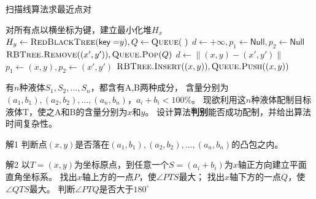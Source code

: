 \begin{questions}
    \begin{algorithm}[!htp]
        \caption{扫描线算法求最近点对}\label{alg:0426:3}
        \begin{algorithmic}[1]
            \State 对所有点以横坐标为键，建立最小化堆$H_x$
            \State $H_y \gets \Call{RedBlackTree}{\mathsf{key=}y}, Q \gets \Call{Queue}{\ }$
            \State $d \gets +\infty, p_1 \gets \mathsf{Null}, p_2 \gets \mathsf{Null}$
             
            \State $\Call{RBTree.Remove}{(x',y')}, \Call{Queue.Pop}{Q}$ 
            \EndWhile
             
            \State $d \gets \left\| (x,y)-(x',y') \right\|$
            \State $p_1 \gets (x,y), p_2 \gets (x',y')$
            \EndIf
            \EndFor
            \State $\Call{RBTree.Insert}{(x,y)}, \Call{Queue.Push}{(x,y)}$
            \EndFor
        \end{algorithmic}
    \end{algorithm}

    \question 有$n$种液体$S_1, S_2, \dots , S_n$，都含有A,B两种成分，
    含量分别为$(a_1,b_1),(a_2,b_2), \dots ,(a_n,b_n)$，$a_i + b_i<100 \%$。
    现欲利用这$n$种液体配制目标液体T，使之A和B的含量分别为$x$和$y$。
    设计算法\textbf{判别}能否成功配制，并给出算法时间复杂性。
    \begin{solution}
        \textsf{解1} \quad
        判断点$(x,y)$是否落在$(a_1,b_1),(a_2,b_2), \dots ,(a_n,b_n)$的凸包之内。

        \textsf{解2} \quad
        以$T=(x,y)$为坐标原点，到任意一个$S=(a_i + b_i)$为$x$轴正方向建立平面直角坐标系。
        找出$x$轴上方的一点$P$，使$\angle PTS$最大；
        找出$x$轴下方的一点$Q$，使$\angle QTS$最大。
        判断$\angle PTQ$是否大于$180^\circ$

    \end{solution}



\end{questions}
